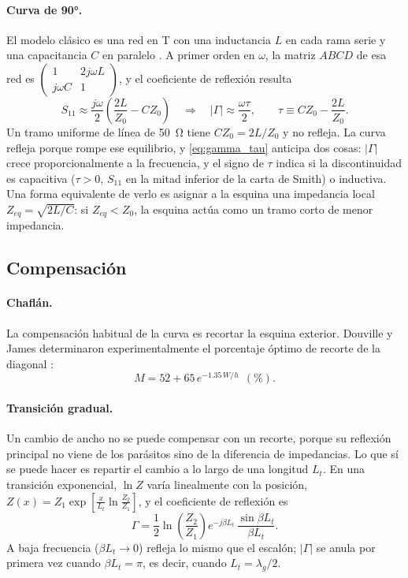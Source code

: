 \documentclass[11pt,letterpaper]{article}
\begin{document}
\paragraph{Curva de \ang{90}.} El modelo clásico es una red en T con una inductancia $L$ en cada rama serie y una capacitancia $C$ en paralelo \cite{gupta}. A primer orden en $\omega$, la matriz $ABCD$ de esa red es $\begin{pmatrix}1 & 2j\omega L\\ j\omega C & 1\end{pmatrix}$, y el coeficiente de reflexión resulta
\begin{equation}
S_{11} \approx \frac{j\omega}{2}\left(\frac{2L}{Z_0} - C Z_0\right)
\quad\Longrightarrow\quad
|\Gamma| \approx \frac{\omega\tau}{2}, \qquad \tau \equiv C Z_0 - \frac{2L}{Z_0}.
\label{eq:gamma_tau}
\end{equation}
Un tramo uniforme de línea de \SI{50}{\ohm} tiene $C Z_0 = 2L/Z_0$ y no refleja. La curva refleja porque rompe ese equilibrio, y \eqref{eq:gamma_tau} anticipa dos cosas: $|\Gamma|$ crece proporcionalmente a la frecuencia, y el signo de $\tau$ indica si la discontinuidad es capacitiva ($\tau>0$, $S_{11}$ en la mitad inferior de la carta de Smith) o inductiva. Una forma equivalente de verlo es asignar a la esquina una impedancia local $Z_{eq}=\sqrt{2L/C}$: si $Z_{eq}<Z_0$, la esquina actúa como un tramo corto de menor impedancia.

\subsection{Compensación}
\paragraph{Chaflán.} La compensación habitual de la curva es recortar la esquina exterior. Douville y James determinaron experimentalmente el porcentaje óptimo de recorte de la diagonal \cite{douville}:
\begin{equation}
M = 52 + 65\,e^{-1.35\,W/h}\ \ (\%).
\label{eq:miter}
\end{equation}

\paragraph{Transición gradual.} Un cambio de ancho no se puede compensar con un recorte, porque su reflexión principal no viene de los parásitos sino de la diferencia de impedancias. Lo que sí se puede hacer es repartir el cambio a lo largo de una longitud $L_t$. En una transición exponencial, $\ln Z$ varía linealmente con la posición, $Z(x)=Z_1\exp\!\left[\frac{x}{L_t}\ln\frac{Z_2}{Z_1}\right]$, y el coeficiente de reflexión es \cite{pozar}
\begin{equation}
\Gamma = \frac{1}{2}\ln\!\left(\frac{Z_2}{Z_1}\right) e^{-j\beta L_t}\,\frac{\sin\beta L_t}{\beta L_t}.
\label{eq:taper}
\end{equation}
A baja frecuencia ($\beta L_t\to 0$) refleja lo mismo que el escalón; $|\Gamma|$ se anula por primera vez cuando $\beta L_t=\pi$, es decir, cuando $L_t=\lambda_g/2$.
\end{document}

